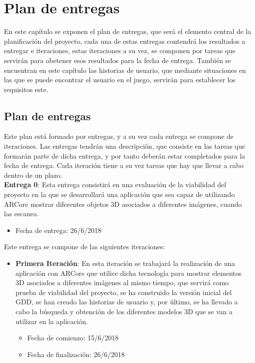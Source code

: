 \chapter{Plan de entregas}
\label{ch:plan}
En este capítulo se exponen el plan de entregas, que será el elemento central de la planificación del proyecto, cada una de estas entregas contendrá los resultados a entregar e iteraciones, estas iteraciones a su vez, se componen por tareas que servirán para obetener esos resultados para la fecha de entrega. También se encuentran en este capítulo las historias de usuario, que mediante situaciones en las que se puede encontrar el usuario en el juego, servirán para establecer los requisitos este.


\section{Plan de entregas}
Este plan está formado por entregas, y a su vez cada entrega se compone de iteraciones. Las entregas tendrán una descripción, que consiste en las tareas que formarán parte de dicha entrega, y por tanto deberán estar completados para la fecha de entrega. Cada iteración tiene a su vez tareas que hay que llevar a cabo dentro de un plazo.\\

\textbf{Entrega 0}: Esta entrega consistirá en una evaluación de la viabilidad del proyecto en la que se desarrollará una aplicación que sea capaz de utilizando ARCore mostrar diferentes objetos 3D asociados a diferentes imágenes, cuando las escanea.

\begin{itemize}
  \item Fecha de entrega: 26/6/2018
\end{itemize}

\hfill

Este entrega se compone de las siguientes iteraciones:

\begin{itemize}
  \item \textbf{Primera Iteración}: En esta iteración se trabajará la realización de una aplicación con ARCore que utilice dicha tecnología para mostrar elementos 3D asociados a diferentes imágenes al mismo tiempo, que servirá como prueba de viabilidad del proyecto, se ha construido la versión inicial del GDD, se han creado las historias de usuario y, por último, se ha llevado a cabo la búsqueda y obtención de los diferentes modelos 3D que se van a utilizar en la aplicación.

  \begin{itemize}
    \item Fecha de comienzo: 15/6/2018
    \item Fecha de finalización: 26/6/2018
  \end{itemize}

\end{itemize}

